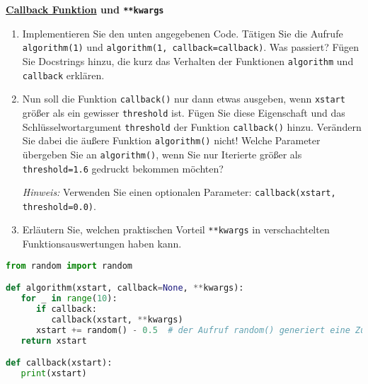 \textbf{\href{https://de.wikipedia.org/wiki/R\%C3\%BCckruffunktion}{Callback Funktion} und \texttt{**kwargs}}
\begin{enumerate}
	\item Implementieren Sie den unten angegebenen Code. Tätigen Sie die Aufrufe \texttt{algorithm(1)} und \texttt{algorithm(1, callback=callback)}. Was passiert? Fügen Sie Docstrings hinzu, die kurz das Verhalten der Funktionen \texttt{algorithm} und \texttt{callback} erklären.
	\item Nun soll die Funktion \verb|callback()| nur dann etwas ausgeben, wenn \verb|xstart| größer als ein gewisser \verb|threshold| ist. Fügen Sie diese Eigenschaft und das Schlüsselwortargument \verb|threshold| der Funktion \verb|callback()| hinzu. Verändern Sie dabei die äußere Funktion \verb|algorithm()| nicht! Welche Parameter übergeben Sie an \verb|algorithm()|, wenn Sie nur Iterierte größer als \texttt{threshold=1.6} gedruckt bekommen möchten?
	
	\textit{Hinweis:} Verwenden Sie einen optionalen Parameter: \verb|callback(xstart, threshold=0.0)|.
	\item Erläutern Sie, welchen praktischen Vorteil \verb|**kwargs| in verschachtelten Funktionsauswertungen haben kann.
\end{enumerate}

\begin{lstlisting}[language=Python]
from random import random

def algorithm(xstart, callback=None, **kwargs):
   for _ in range(10):
      if callback:
         callback(xstart, **kwargs)
      xstart += random() - 0.5  # der Aufruf random() generiert eine Zufallszahl in [0,1]
   return xstart

def callback(xstart):
   print(xstart)
\end{lstlisting}